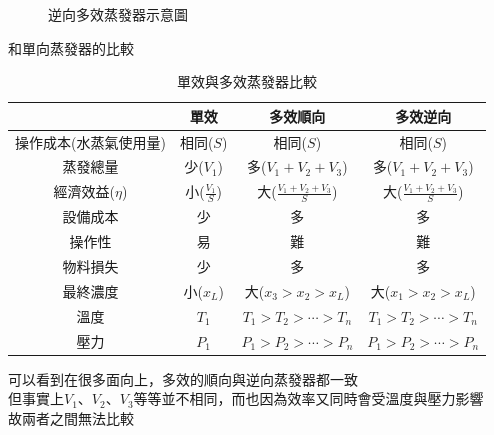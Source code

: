 \documentclass[../main.tex]{subfiles}
\begin{document}
\begin{itemize}
\begin{enumerate}
\begin{enumerate}
\begin{figure}[H]
        \caption{逆向多效蒸發器示意圖}
      \end{figure}
      和單向蒸發器的比較
      \renewcommand{\arraystretch}{1.5}
      \begin{table}[H]
        \centering
        \begin{tabular}{|c|c|c|c|}
          \hline   & 單效 & 多效順向 & 多效逆向 \\\hline
          操作成本(水蒸氣使用量) &  相同($S$) & 相同($S$) & 相同($S$) \\\hline
          蒸發總量 & 少($V_1$) & 多($V_1+V_2+V_3$) & 多($V_1+V_2+V_3$)\\\hline
          經濟效益($\eta$) & 小($\frac{V_1}{S}$) & 大($\frac{V_1+V_2+V_3}{S}$) & 大($\frac{V_1+V_2+V_3}{S}$)\\\hline
          設備成本 & 少 & 多 & 多\\\hline
          操作性  & 易 & 難 & 難\\\hline
          物料損失 & 少 & 多 & 多\\\hline
          最終濃度 & 小($x_L$) & 大($x_3>x_2>x_L$) & 大($x_1>x_2>x_L$)\\\hline
          溫度 & $T_1$ & $T_1>T_2>\cdots>T_n$ & $T_1>T_2>\cdots>T_n$\\\hline
          壓力 & $P_1$ & $P_1>P_2>\cdots>P_n$ & $P_1>P_2>\cdots>P_n$ \\\hline
        \end{tabular}
        \caption{單效與多效蒸發器比較}
      \end{table}
      可以看到在很多面向上，多效的順向與逆向蒸發器都一致\\
      但事實上$V_1$、$V_2$、$V_3$等等並不相同，而也因為效率又同時會受溫度與壓力影響\\
      故兩者之間無法比較
    \end{enumerate}
  \end{enumerate}
\end{itemize}
\end{document}
